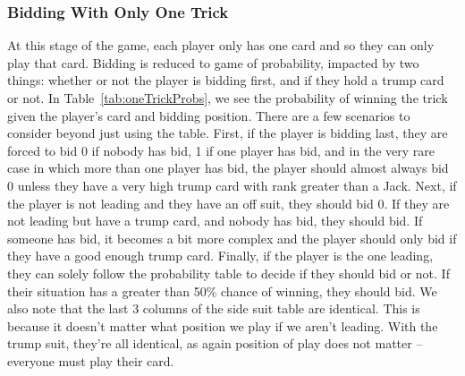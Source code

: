 \documentclass{article}
\begin{document}
\subsubsection{Bidding With Only One Trick}
At this stage of the game, each player only has one card and so they can only play that card. Bidding is reduced to game of probability, impacted by two things: whether or not the player is bidding first, and if they hold a trump card or not. 
In Table~\ref{tab:oneTrickProbs}, we see the probability of winning the trick given the player's card and bidding position. There are a few scenarios to consider beyond just using the table.
First, if the player is bidding last, they are forced to bid 0 if nobody has bid, 1 if one player has bid, and in the very rare case in which more than one player has bid, the player should almost always bid 0 unless they have a very high trump card with rank greater than a Jack. 
Next, if the player is not leading and they have an off suit, they should bid 0. If they are not leading but have a trump card, and nobody has bid, they should bid. If someone has bid, it becomes a bit more complex and the player should only bid if they have a good enough trump card. Finally, if the player is the one leading, they can solely follow the probability table to decide if they should bid or not. If their situation has a greater than 50\% chance of winning, they should bid.
We also note that the last 3 columns of the side suit table are identical. This is because it doesn't matter what position we play if we aren't leading. With the trump suit, they're all identical, as again position of play does not matter -- everyone must play their card.
\end{document}
